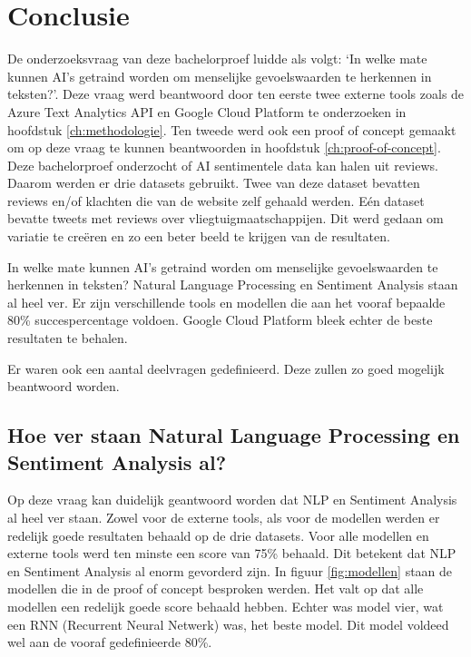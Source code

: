 
\chapter{Conclusie}
\label{ch:conclusie}


De onderzoeksvraag van deze bachelorproef luidde als volgt: `In welke mate kunnen AI's getraind worden om menselijke gevoelswaarden te herkennen in teksten?'. Deze vraag werd beantwoord door ten eerste twee externe tools zoals de Azure Text Analytics API en Google Cloud Platform te onderzoeken in hoofdstuk \ref{ch:methodologie}. Ten tweede werd ook een proof of concept gemaakt om op deze vraag te kunnen beantwoorden in hoofdstuk \ref{ch:proof-of-concept}. Deze bachelorproef onderzocht of AI sentimentele data kan halen uit reviews. Daarom werden er drie datasets gebruikt. Twee van deze dataset bevatten reviews en/of klachten die van de website zelf gehaald werden. Eén dataset bevatte tweets met reviews over vliegtuigmaatschappijen. Dit werd gedaan om variatie te creëren en zo een beter beeld te krijgen van de resultaten.

In welke mate kunnen AI's getraind worden om menselijke gevoelswaarden te herkennen in teksten? Natural Language Processing en Sentiment Analysis staan al heel ver. Er zijn verschillende tools en modellen die aan het vooraf bepaalde 80\% succespercentage voldoen. Google Cloud Platform bleek echter de beste resultaten te behalen.

Er waren ook een aantal deelvragen gedefinieerd. Deze zullen zo goed mogelijk beantwoord worden.

\section{Hoe ver staan Natural Language Processing en Sentiment Analysis al?}
\label{sec:hoever}
Op deze vraag kan duidelijk geantwoord worden dat NLP en Sentiment Analysis al heel ver staan. Zowel voor de externe tools, als voor de modellen werden er redelijk goede resultaten behaald op de drie datasets.
Voor alle modellen en externe tools werd ten minste een score van 75\% behaald. Dit betekent dat NLP en Sentiment Analysis al enorm gevorderd zijn.
In figuur \ref{fig:modellen} staan de modellen die in de proof of concept besproken werden. Het valt op dat alle modellen een redelijk goede score behaald hebben. Echter was model vier, wat een RNN (Recurrent Neural Netwerk) was, het beste model. Dit model voldeed wel aan de vooraf gedefinieerde 80\%.

